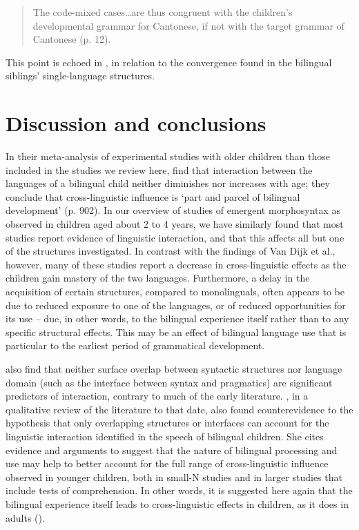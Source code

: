\documentclass[output=paper]{langscibook}
\begin{document}
\begin{quote}
The code-mixed cases…are thus congruent with the children’s developmental grammar for Cantonese, if not with the target grammar of Cantonese (p. 12).
\end{quote}

This point is echoed in \citet{Vihman2018}, in relation to the convergence found in the bilingual siblings’ single-language structures.

\section{Discussion and conclusions}

In their meta-analysis of experimental studies with older children than those included in the studies we review here, \citet{VanDijkEtAl2022} find that interaction between the languages of a bilingual child neither diminishes nor increases with age; they conclude that cross-linguistic influence is ‘part and parcel of bilingual development’ (p. 902). In our overview of studies of emergent morphosyntax as observed in children aged about 2 to 4 years, we have similarly found that most studies report evidence of linguistic interaction, and that this affects all but one of the structures investigated. In contrast with the findings of Van Dijk et al., however, many of these studies report a decrease in cross-linguistic effects as the children gain mastery of the two languages. Furthermore, a delay in the acquisition of certain structures, compared to monolinguals, often appears to be due to reduced exposure to one of the languages, or of reduced opportunities for its use – due, in other words, to the bilingual experience itself rather than to any specific structural effects. This may be an effect of bilingual language use that is particular to the earliest period of grammatical development.

\citet{VanDijkEtAl2022} also find that neither surface overlap between syntactic structures nor language domain (such as the interface between syntax and pragmatics) are significant predictors of interaction, contrary to much of the early literature. \citet{Serratrice2013}, in a qualitative review of the literature to that date, also found counterevidence to the hypothesis that only overlapping structures or interfaces can account for the linguistic interaction identified in the speech of bilingual children. She cites evidence and arguments to suggest that the nature of bilingual processing and use may help to better account for the full range of cross-linguistic influence observed in younger children, both in small-N studies and in larger studies that include tests of comprehension. In other words, it is suggested here again that the bilingual experience itself leads to cross-linguistic effects in children, as it does in adults (\citealt{Kroll2013}).
\end{document}

